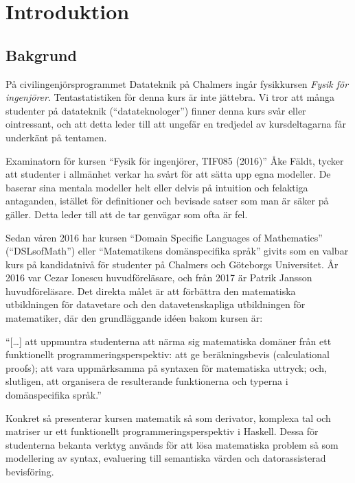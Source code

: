
\chapter{Introduktion}

\section{Bakgrund}

\begin{binge}
På civilingenjörsprogrammet Datateknik på Chalmers ingår fysikkursen
\textit{Fysik för ingenjörer}. Tentastatistiken för denna kurs är
inte jättebra\cite{tentastatistik}. Vi
tror att många studenter på datateknik (``datateknologer'') finner denna kurs
svår eller ointressant, och att detta leder till att ungefär en
tredjedel av kursdeltagarna får underkänt på tentamen.

Examinatorn för kursen ``Fysik för ingenjörer, TIF085 (2016)'' Åke Fäldt, tycker
att studenter i allmänhet verkar ha svårt för att sätta upp egna
modeller. De baserar sina mentala modeller helt eller delvis på
intuition och felaktiga antaganden, istället för definitioner och
bevisade satser som man är säker på gäller. Detta leder till att de
tar genvägar som ofta är fel.

Sedan våren 2016 har kursen ``Domain Specific Languages of
Mathematics'' (``DSLsofMath'') eller ``Matematikens domänspecifika språk''
givits som en valbar kurs på kandidatnivå för studenter på Chalmers och
Göteborgs Universitet. År 2016 var Cezar Ionescu huvudföreläsare, och från 2017
är Patrik Jansson huvudföreläsare. Det direkta målet är att förbättra den
matematiska utbildningen för datavetare och den datavetenskapliga utbildningen
för matematiker, där den grundläggande idéen bakom kursen är: 

\begin{center}
  ``[\dots] att uppmuntra studenterna att närma sig matematiska domäner från ett
  funktionellt programmeringsperspektiv: att ge beräkningsbevis (calculational
  proofs); att vara uppmärksamma på syntaxen för matematiska uttryck; och,
  slutligen, att organisera de resulterande funktionerna och typerna i
  domänspecifika språk.''\cite{lecture-notes}\cite{tfpie2015} 
\end{center}

Konkret så presenterar kursen matematik så som derivator, komplexa
tal och matriser ur ett funktionellt programmeringsperspektiv i
Haskell. Dessa för studenterna bekanta verktyg används för att lösa
matematiska problem så som modellering av syntax, evaluering till
semantiska värden och datorassisterad bevisföring.


\end{binge}
